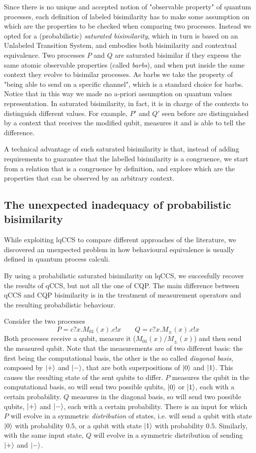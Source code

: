 Since there  is no unique and accepted notion of "observable property" of quantum processes, each definition of labeled bisimilarity has to make some assumption on which are the properties to be checked when comparing two processes. Instead we opted for a (probabilistic) \textit{saturated bisimilarity}, which in turn is based on an Unlabeled Transition System, and embodies both bisimilarity and contextual equivalence. Two processes $P$ and $Q$ are saturated bisimilar if they express the same atomic observable properties (called \textit{barbs}), and when put inside the same context they evolve to bisimilar processes. As barbs we take the property of "being able to send on a specific channel", which  is a standard choice for barbs. Notice that in this way we made no a-priori assumption on quantum values representation. In saturated bisimilarity, in fact, it is in charge of the contexts to distinguish different values. For example, $P'$ and $Q'$ seen before are distinguished by a context that receives the modified qubit, measures it and is able to tell the difference.

A technical advantage of such saturated bisimilarity is that, instead of adding requirements to guarantee that the labelled bisimilarity is a congruence, we start from a relation that is a congruence by definition, and explore which are the properties that can be observed by an arbitrary context.


\subsection*{The unexpected inadequacy of probabilistic bisimilarity}

While exploiting lqCCS to compare different approaches of the literature, we discovered an unexpected  problem in how behavioural equivalence is usually defined in quantum process calculi.

By using a probabilistic saturated bisimilarity on lqCCS, we succesfully recover the results of qCCS, but not all the one of CQP. The main difference between qCCS and CQP bisimilarity is in the treatment of measurement operators and the resulting probabilistic behaviour.

Consider the two processes 
\[P = c?x.M_{01}(x).c!x \qquad Q = c?x.M_\pm(x).c!x\]
Both processes receive a qubit, measure it ($M_{01}(x) / M_{\pm}(x)$) and then send the measured qubit. Note that the measurements are of two different basis: the first being the computational basis, the other is the so called \textit{diagonal basis}, composed by $\ket{+}$ and $\ket{-}$, that are both superpositions of $\ket{0}$ and $\ket{1}$.  This causes the resulting state of the sent qubits to differ. $P$ measures the qubit in the computational basis, so will send two possible qubits, $\ket{0}$ or $\ket{1}$, each with a certain probability. $Q$ measures in the diagonal basis, so will send two possible qubits, $\ket{+}$ and $\ket{-}$, each with a certain probability. There is an input for which $P$ will evolve in a symmetric \textit{distribution} of states, i.e. will send a qubit with state $\ket{0}$ with probability $0.5$, or a qubit with state $\ket{1}$ with probability $0.5$. Similarly, with the same input state, $Q$ will evolve in a symmetric distribution of sending $\ket{+}$ and $\ket{-}$.

